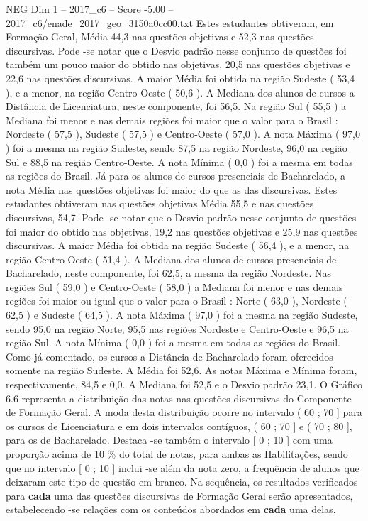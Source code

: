 \begin{textsample}{NEG Dim 1 – 2017\_c6 – Score -5.00 – 2017\_c6/enade\_2017\_geo\_3150a0cc00.txt}
Estes estudantes obtiveram, em Formação Geral, Média 44,3 nas questões objetivas e 52,3 nas questões discursivas.
Pode -se notar que o Desvio padrão nesse conjunto de questões foi também um pouco maior do obtido nas objetivas, 20,5 nas questões objetivas e 22,6 nas questões discursivas.
A maior Média foi obtida na região Sudeste ( 53,4 ), e a menor, na região Centro-Oeste ( 50,6 ).
A Mediana dos alunos de cursos a Distância de Licenciatura, neste componente, foi 56,5.
Na região Sul ( 55,5 ) a Mediana foi menor e nas demais regiões foi maior que o valor para o Brasil : Nordeste ( 57,5 ), Sudeste ( 57,5 ) e Centro-Oeste ( 57,0 ).
A nota Máxima ( 97,0 ) foi a mesma na região Sudeste, sendo 87,5 na região Nordeste, 96,0 na região Sul e 88,5 na região Centro-Oeste.
A nota Mínima ( 0,0 ) foi a mesma em todas as regiões do Brasil.
Já para os alunos de cursos presenciais de Bacharelado, a nota Média nas questões objetivas foi maior do que as das discursivas.
Estes estudantes obtiveram nas questões objetivas Média 55,5 e nas questões discursivas, 54,7.
Pode -se notar que o Desvio padrão nesse conjunto de questões foi maior do obtido nas objetivas, 19,2 nas questões objetivas e 25,9 nas questões discursivas.
A maior Média foi obtida na região Sudeste ( 56,4 ), e a menor, na região Centro-Oeste ( 51,4 ).
A Mediana dos alunos de cursos presenciais de Bacharelado, neste componente, foi 62,5, a mesma da região Nordeste.
Nas regiões Sul ( 59,0 ) e Centro-Oeste ( 58,0 ) a Mediana foi menor e nas demais regiões foi maior ou igual que o valor para o Brasil : Norte ( 63,0 ), Nordeste ( 62,5 ) e Sudeste ( 64,5 ).
A nota Máxima ( 97,0 ) foi a mesma na região Sudeste, sendo 95,0 na região Norte, 95,5 nas regiões Nordeste e Centro-Oeste e 96,5 na região Sul.
A nota Mínima ( 0,0 ) foi a mesma em todas as regiões do Brasil.
Como já comentado, os cursos a Distância de Bacharelado foram oferecidos somente na região Sudeste.
A Média foi 52,6.
As notas Máxima e Mínima foram, respectivamente, 84,5 e 0,0.
A Mediana foi 52,5 e o Desvio padrão 23,1.
O Gráfico 6.6 representa a distribuição das notas nas questões discursivas do Componente de Formação Geral.
A moda desta distribuição ocorre no intervalo ( 60 ; 70 ] para os cursos de Licenciatura e em dois intervalos contíguos, ( 60 ; 70 ] e ( 70 ; 80 ], para os de Bacharelado.
Destaca -se também o intervalo [ 0 ; 10 ] com uma proporção acima de 10 \% do total de notas, para ambas as Habilitações, sendo que no intervalo [ 0 ; 10 ] inclui -se além da nota zero, a frequência de alunos que deixaram este tipo de questão em branco.
Na sequência, os resultados verificados para \textbf{cada} uma das questões discursivas de Formação Geral serão apresentados, estabelecendo -se relações com os conteúdos abordados em \textbf{cada} uma delas.

\end{textsample}
